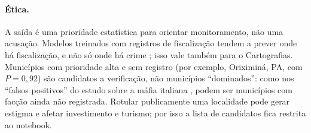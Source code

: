\documentclass[article,12pt,oneside,a4paper,brazil,sumario=tradicional]{abntex2}
\begin{document}
\paragraph{Ética.} A saída é uma prioridade estatística para orientar monitoramento, não uma
acusação. Modelos treinados com registros de fiscalização tendem a prever onde há
fiscalização, e não só onde há crime \cite{r20}; isso vale também para o Cartografias.
Municípios com prioridade alta e sem registro (por exemplo, Oriximiná, PA,
com $P=0{,}92$) são candidatos a verificação, não municípios ``dominados'': como nos
``falsos positivos'' do estudo sobre a máfia italiana \cite{r17}, podem ser municípios com facção ainda não
registrada. Rotular publicamente uma localidade pode gerar estigma e afetar investimento e
turismo; por isso a lista de candidatos fica restrita ao notebook.

\postextual

\nocite{r3}

\end{document}
